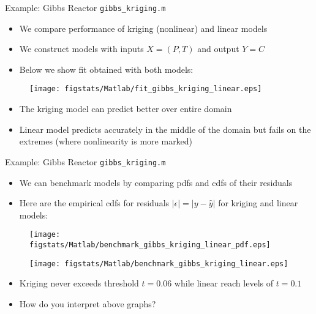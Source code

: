 \documentclass[handout,9pt]{beamer}
\begin{document}
%
\begin{frame}{Example: Gibbs Reactor \footnotesize{\texttt{gibbs\_kriging.m}}}

\begin{itemize}
   \setlength{\itemsep}{10pt}
\item We compare performance of kriging (nonlinear) and linear models 
\item We construct models with inputs $X=(P,T)$ and output $Y=C$ 
\item Below we show fit obtained with both models: 
\end{itemize}

\begin{figure}[!htb]
    \centering
	\texttt{[image: figstats/Matlab/fit\_gibbs\_kriging\_linear.eps]}
\end{figure}

\begin{itemize}
   \setlength{\itemsep}{10pt}
\item The kriging model can predict better over entire domain
\item Linear model predicts accurately in the middle of the domain but fails on the extremes (where nonlinearity is more marked)
\end{itemize}

\end{frame}

%
\begin{frame}{Example: Gibbs Reactor \footnotesize{\texttt{gibbs\_kriging.m}}}

\begin{itemize}
   \setlength{\itemsep}{10pt}
\item We can benchmark models by comparing pdfs and cdfs of their residuals
\item Here are the empirical cdfs for residuals $|\epsilon|=|y-\hat{y}|$ for kriging and linear models:
\end{itemize}

\begin{figure}[!htb]
    \centering
	\texttt{[image: figstats/Matlab/benchmark\_gibbs\_kriging\_linear\_pdf.eps]}
\end{figure}
\begin{figure}[!htb]
    \centering
	\texttt{[image: figstats/Matlab/benchmark\_gibbs\_kriging\_linear.eps]}
\end{figure}

\begin{itemize}
   \setlength{\itemsep}{10pt}
\item Kriging never exceeds threshold $t=0.06$ while linear reach levels of $t=0.1$
\item How do you interpret above graphs? 
\end{itemize}

\end{frame}
\end{document}
